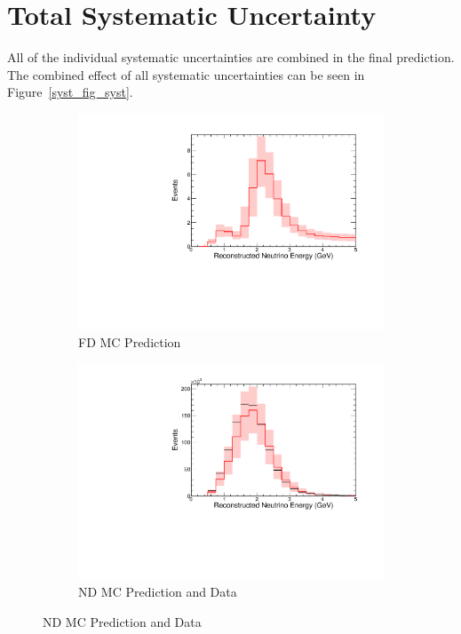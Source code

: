 {\begin{figure}
\end{figure}

\clearpage
\section{Total Systematic Uncertainty}

All of the individual systematic uncertainties are combined in the final prediction.
The combined effect of all systematic uncertainties can be seen in
Figure~\ref{syst_fig_syst}.



\begin{figure}
\begin{center}
\begin{subfigure}[c]{0.49\textwidth}
\includegraphics[width=\textwidth]{figures/systs/prediction/fd_mc_prediction_full_syst.pdf}
\caption*{FD MC Prediction}
\end{subfigure}
\begin{subfigure}[c]{0.49\textwidth}
\includegraphics[width=\textwidth]{figures/systs/prediction/nd_mc_prediction_full_syst.pdf}
\caption*{ND MC Prediction and Data}
\end{subfigure}


\end{center}
\end{figure}}
